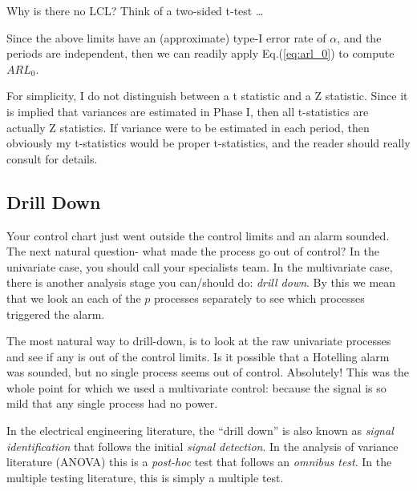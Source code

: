 \begin{think}
Why is there no LCL? 
Think of a two-sided t-test \dots
\end{think}

Since the above limits have an (approximate) type-I error rate of $\alpha$, and the periods are independent, then we can readily apply Eq.(\ref{eq:arl_0}) to compute $ARL_0$.


\begin{remark}
For simplicity, I do not distinguish between a t statistic and a Z statistic.
Since it is implied that variances are estimated in Phase I, then all t-statistics are actually Z statistics.
If variance were to be estimated in each period, then obviously my t-statistics would be proper t-statistics, and the reader should really consult  \cite[Ch.7]{qiu_introduction_2013} for details. 
\end{remark}




\subsection{Drill Down}
Your control chart just went outside the control limits and an alarm sounded.
The next natural question- what made the process go out of control?
In the univariate case, you should call your specialists team. 
In the multivariate case, there is another analysis stage you can/should do: \emph{drill down}.
By this we mean that we look an each of the $p$ processes separately to see which processes triggered the alarm.

The most natural way to drill-down, is to look at the raw univariate processes and see if any is out of the control limits.
Is it possible that a Hotelling alarm was sounded, but no single process seems out of control.
Absolutely! 
This was the whole point for which we used a multivariate control: because the signal is so mild that any single process had no power.

\begin{extra}
In the electrical engineering literature, the ``drill down'' is also known as \emph{signal identification} that follows the initial \emph{signal detection}. 
In the analysis of variance literature (ANOVA) this is a \emph{post-hoc} test that follows an \emph{omnibus test}.
In the multiple testing literature, this is simply a multiple test. 
\end{extra}

